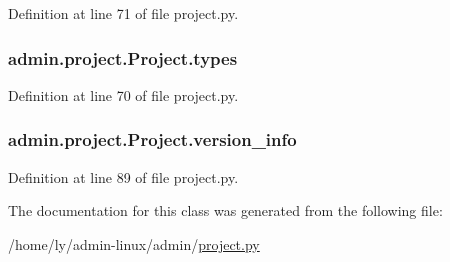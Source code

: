 Definition at line 71 of file project.\-py.

\hypertarget{classadmin_1_1project_1_1Project_a59410622c6509fbb15e056da984ca5b1}{
\subsubsection[{types}]{\setlength{\rightskip}{0pt plus 5cm}admin.\-project.\-Project.\-types}}\label{classadmin_1_1project_1_1Project_a59410622c6509fbb15e056da984ca5b1}


Definition at line 70 of file project.\-py.

\hypertarget{classadmin_1_1project_1_1Project_aead4e47be18c6ddbfd19d3b5aab88bda}{
\subsubsection[{version\-\_\-info}]{\setlength{\rightskip}{0pt plus 5cm}admin.\-project.\-Project.\-version\-\_\-info}}\label{classadmin_1_1project_1_1Project_aead4e47be18c6ddbfd19d3b5aab88bda}


Definition at line 89 of file project.\-py.



The documentation for this class was generated from the following file\-:\begin{DoxyCompactItemize}
\item 
/home/ly/admin-\/linux/admin/\hyperlink{project_8py}{project.\-py}\end{DoxyCompactItemize}
